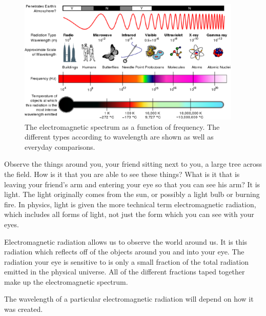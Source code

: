 \begin{figure}[htbp]
\begin{center}
\includegraphics[width=0.95\textwidth]{../../epsimages/EM_Spectrum_Properties_edit.eps}%
\caption{The electromagnetic spectrum as a function of frequency. The different types according to wavelength are shown as well as everyday comparisons.}
\end{center}
\end{figure}

Observe the things around you, your friend sitting next to you, a large tree across the field. How is it that you are able to see these things? What is it that is leaving your friend's arm and entering your eye so that you can see his arm? It is light. The light originally comes from the sun, or possibly a light bulb or burning fire. In physics, light is given the more technical term electromagnetic radiation, which includes all forms of light, not just the form which you can see with your eyes. 

Electromagnetic radiation allows us to observe the world around us. It is this radiation which reflects off of the objects around you and into your eye. The radiation your eye is sensitive to is only a small fraction of the total radiation emitted in the physical universe. All of the different fractions taped together make up the electromagnetic spectrum. 


The wavelength of a particular electromagnetic radiation will depend on how it was created. 


